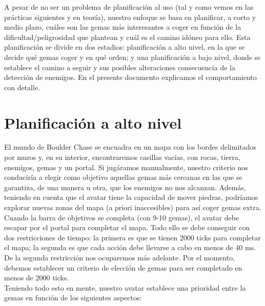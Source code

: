 A pesar de no ser un problema de planificación al uso (tal y como vemos en las prácticas siguientes y en teoría), nuestro enfoque se basa en planificar, a corto y medio plazo, cuáles son las gemas más interesantes a coger en función de la dificultad/peligrosidad que plantean y cuál es el camino idóneo para ello. Esta planificación se divide en dos estadios: planificación a alto nivel, en la que se decide qué gemas coger y en qué orden; y una planificación a bajo nivel, donde se establece el camino a seguir y sus posibles alteraciones consecuencia de la detección de enemigos. En el presente documento explicamos el comportamiento con detalle.

\section{Planificación a alto nivel}

El mundo de Boulder Chase se encuadra en un mapa con los bordes delimitados por muros y, en su interior, encontraremos casillas vacías, con rocas, tierra, enemigos, gemas y un portal. Si jugáramos manualmente, nuestro criterio nos conduciría a elegir como objetivo aquellas gemas más cercanas en las que se garantiza, de una manera u otra, que los enemigos no nos alcanzan. Además, teniendo en cuenta que el avatar tiene la capacidad de mover piedras, podríamos explorar nuevas zonas del mapa (a priori inaccesibles) para así coger gemas extra. Cuando la barra de objetivos se completa (con 9-10 gemas), el avatar debe escapar por el portal para completar el mapa. Todo ello se debe conseguir con dos restricciones de tiempo: la primera es que se tienen 2000 ticks para completar el mapa; la segunda es que cada acción debe llevarse a cabo en menos de 40 ms. De la segunda restricción nos ocuparemos más adelante. Por el momento, debemos establecer un criterio de elección de gemas para ser completado en menos de 2000 ticks.  \\

Teniendo todo esto en mente, nuestro avatar establece una prioridad entre la gemas en función de los siguientes aspectos:

